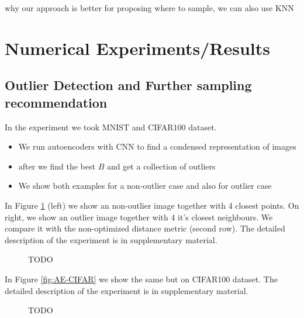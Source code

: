 \documentclass{article}
\begin{document}
why our approach is better for proposing where to sample, we can also use KNN










\clearpage
\onecolumn 
\section{Numerical Experiments/Results}


\subsection{Outlier Detection and Further sampling recommendation}

In the experiment we took MNIST and CIFAR100 dataset.
\begin{itemize}
\item We run autoencoders with CNN to 
find a condensed representation of images
\item after we find the best $B$ and get a collection of outliers
\item We show both examples for a non-outlier case and also for outlier case
\end{itemize}


In Figure \ref{fig:AE-MNIST}
(left) we show an non-outlier image together with 4 closest points.
On right, we show an outlier image together with 4 it's closest neighbours.
We compare it with the non-optimized distance metric (second row). The detailed description of the experiment is in supplementary material.
\begin{figure}[h!]

\caption{TODO}
\label{fig:AE-MNIST}

\end{figure}

In Figure \eqref{fig:AE-CIFAR}
we show the same but on CIFAR100 dataset.
The detailed description of the experiment is in supplementary material.
\begin{figure}[h!]

\caption{TODO}
\label{fig:AE-CIFAR}

\end{figure}



 
\end{document}
